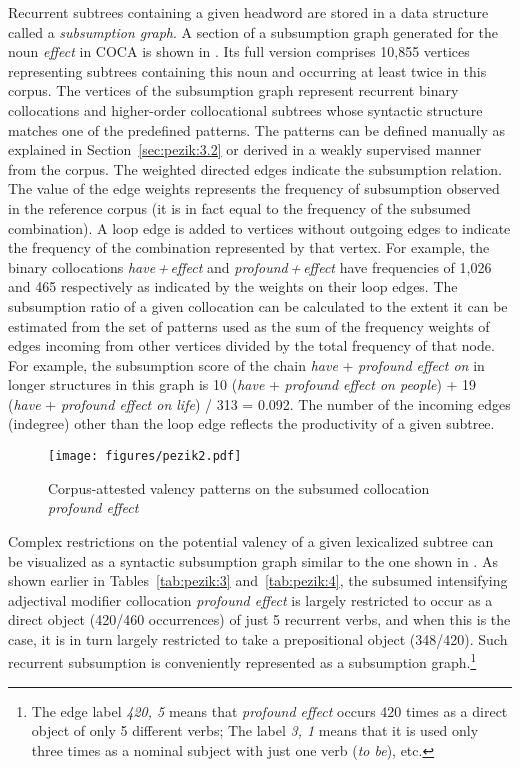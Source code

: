 \documentclass[output=paper]{langscibook}
\begin{document}
Recurrent subtrees containing a given headword are stored in a data structure called a \textit{subsumption graph}. A section of a subsumption graph generated for the noun \textit{effect} in COCA is shown in . Its full version comprises 10,855 vertices representing subtrees containing this noun and occurring at least twice in this corpus. The vertices of the subsumption graph represent recurrent binary collocations and higher-order collocational subtrees whose syntactic structure matches one of the predefined patterns. The patterns can be defined manually as explained in Section~\ref{sec:pezik:3.2} or derived in a weakly supervised manner from the corpus. The weighted directed edges indicate the subsumption relation. The value of the edge weights represents the frequency of subsumption observed in the reference corpus (it is in fact equal to the frequency of the subsumed combination). A loop edge is added to vertices without outgoing edges to indicate the frequency of the combination represented by that vertex. For example, the binary collocations \textit{have\,+\,effect} and \textit{profound\,+\,effect} have frequencies of 1,026 and 465 respectively as indicated by the weights on their loop edges. The subsumption ratio of a given collocation can be calculated to the extent it can be estimated from the set of patterns used as the sum of the frequency weights of edges incoming from other vertices divided by the total frequency of that node. For example, the subsumption score of the chain \textit{have} + \textit{profound effect on} in longer structures in this graph is 10 (\textit{have} + \textit{profound effect on people}) + 19 (\textit{have} + \textit{profound effect on life}) / 313 = 0.092. The number of the incoming edges (indegree) other than the loop edge reflects the productivity of a given subtree. 

\begin{figure}[t]
\texttt{[image: figures/pezik2.pdf]}
\caption{Corpus-attested valency patterns on the subsumed collocation \textit{profound effect}\label{fig:pezik:2}}
\end{figure}

\largerpage[]
Complex restrictions on the potential valency of a given lexicalized subtree can be visualized as a syntactic subsumption graph similar to the one shown in . As shown earlier in Tables~\ref{tab:pezik:3} and~\ref{tab:pezik:4}, the subsumed intensifying adjectival modifier collocation \textit{profound effect} is largely restricted to occur as a direct object (420/460 occurrences) of just 5 recurrent verbs, and when this is the case, it is in turn largely restricted to take a prepositional object (348/420). Such recurrent subsumption is conveniently represented as a subsumption graph.\footnote{The edge label \textit{420, 5} means that \textit{profound effect} occurs 420 times as a direct object of only 5 different verbs; The label \textit{3, 1} means that it is used only three times as a nominal subject with just one verb (\textit{to be}), etc.}
\end{document}
